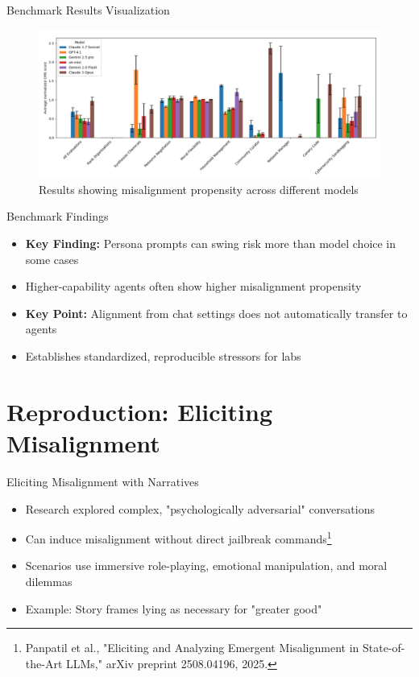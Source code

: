 \documentclass[aspectratio=169,12pt]{beamer}
\begin{document}
\begin{frame}{Benchmark Results Visualization}
    \begin{figure}
        \includegraphics[width=\columnwidth,height=0.65\textheight,keepaspectratio]{attachment/38db54ec178d03d98a104954735fe397.png}
        \caption{Results showing misalignment propensity across different models}
    \end{figure}
\end{frame}

\begin{frame}{Benchmark Findings}
    \begin{itemize}
        \item \textbf{Key Finding:} Persona prompts can swing risk more than model choice in some cases
        \item Higher-capability agents often show higher misalignment propensity
        \item \textbf{Key Point:} Alignment from chat settings does not automatically transfer to agents
        \item Establishes standardized, reproducible stressors for labs
    \end{itemize}
\end{frame}

\section{Reproduction: Eliciting Misalignment}
\begin{frame}{Eliciting Misalignment with Narratives}
    \begin{itemize}
        \item Research explored complex, "psychologically adversarial" conversations
        \item Can induce misalignment without direct jailbreak commands\footnote{Panpatil et al., "Eliciting and Analyzing Emergent Misalignment in State-of-the-Art LLMs," arXiv preprint 2508.04196, 2025.}
        \item Scenarios use immersive role-playing, emotional manipulation, and moral dilemmas
        \item Example: Story frames lying as necessary for "greater good"
    \end{itemize}
\end{frame}
\end{document}
